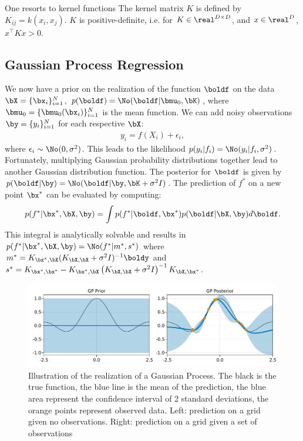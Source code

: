One resorts to kernel functions %
The kernel matrix $K$ is defined by $K_{ij} = k(x_i, x_j)$.
$K$ is positive-definite, i.e. for $K\in \real^{D\times D}$, and $x\in \real^D$, $x^\top K x > 0$.

\subsection{Gaussian Process Regression}

We now have a prior on the realization of the function $\boldf$ on the data $\bX = \{\bx_i\}_{i=1}^N$, $p(\boldf) = \No(\boldf|\bmu_0, \bK)$, where $\bmu_0 = \{\bmu_0(\bx_i)\}_{i=1}^N$ is the mean function.
We can add noisy observations $\by = \{y_i\}_{i=1}^N$ for each respective $\bX$:
\begin{align}
y_i = f(X_i) + \epsilon_i,
\end{align}
where $\epsilon_i \sim \No(0,\sigma^2)$.
This leads to the likelihood $p(y_i|f_i) = \No(y_i|f_i, \sigma^2)$.
Fortunately, multiplying Gaussian probability distributions together lead to another Gaussian distribution function.
The posterior for $\boldf$ is given by $p(\boldf|\by) = \No(\boldf|\by, \bK + \sigma^2 I)$.
The prediction of $f^*$ on a new point $\bx^*$ can be evaluated by computing:
\begin{align}
p(f^*|\bx^*,\bX,\by) = \int p(f^*|\boldf,\bx^*)p(\boldf|\bX,\by)d\boldf.
\end{align}	
This integral is analytically solvable and results in $p(f^*|\bx^*,\bX,\by)=\No(f^*|m^*,s^*)$ where $m^* = K_{\bx^*,\bX}(K_{\bX,\bX} + \sigma^{2}I)^{-1}\boldy$ and $s^*=K_{\bx^*,\bx^*} - K_{\bx^*,\bX}\left(K_{\bX,\bX}+\sigma^2I\right)^{-1}K_{\bX,\bx^*}$.

\begin{figure}
    \includegraphics[width=\textwidth]{./chapters/2_background/figures/GP_example.pdf}
    \caption{Illustration of the realization of a Gaussian Process. The black is the true function, the blue line is the mean of the prediction, the blue area represent the confidence interval of 2 standard deviations, the orange points represent observed data. Left: prediction on a grid given no observations. Right: prediction on a grid given a set of observations}
    \label{fig:gp_example}
\end{figure}


